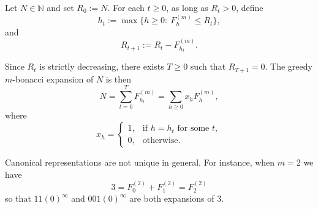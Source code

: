 \documentclass{amsart}
\begin{document}
Let $N\in\mathbb N$ and set $R_0:=N$.
For each $t\geq 0$, as long as $R_t>0$, define
\[
h_t:=\max\{h\geq 0:\ F_h^{(m)}\leq R_t\},
\]
and
\[
R_{t+1}:=R_t-F_{h_t}^{(m)}.
\]

Since $R_t$ is strictly decreasing, there exists $T\geq 0$ such that
$R_{T+1}=0$. The greedy $m$-bonacci expansion of $N$ is then
\[
N=\sum_{t=0}^{T}F_{h_t}^{(m)}
   =\sum_{h\geq 0}x_hF_h^{(m)},
\]
where
\[
x_h=
\begin{cases}
1,& \text{if } h=h_t \text{ for some } t,\\[2mm]
0,& \text{otherwise.}
\end{cases}
\]






Canonical representations are not unique in general. For instance, when $m=2$ we have 
$$3=F_0^{(2)}+F_1^{(2)}=F_2^{(2)}$$
so that $11(0)^\infty$ and $001(0)^\infty$ are both expansions of $3$. 




 
\end{document}
